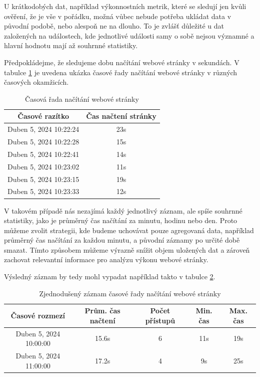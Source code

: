 U krátkodobých dat, například výkonnostních metrik, které se sledují jen kvůli ověření, že je vše v pořádku, možná vůbec nebude 
potřeba ukládat data v původní podobě, nebo alespoň ne na dlouho. To je zvlášť důležité u dat založených na událostech, kde jednotlivé 
události samy o sobě nejsou významné a hlavní hodnotu mají až souhrnné statistiky. \cite{nielsen2019practical}

Předpokládejme, že sledujeme dobu načítání webové stránky v sekundách.
V tabulce \ref{table:1} je uvedena ukázka časové řady načítání webové stránky v různých časových okamžicích.
\begin{table}[ht!]
\centering
\begin{tabular}{||c | c||} 
    \hline
    \textbf{Časové razítko} & \textbf{Čas načtení stránky} \\ [0.5ex] 
    \hline\hline
    Duben 5, 2024 10:22:24 & 23s \\ 
    \hline
    Duben 5, 2024 10:22:28 & 15s \\
    \hline
    Duben 5, 2024 10:22:41 & 14s \\
    \hline
    Duben 5, 2024 10:23:02 & 11s \\
    \hline
    Duben 5, 2024 10:23:15 & 19s \\
    \hline
    Duben 5, 2024 10:23:33 & 12s \\
    \hline
\end{tabular}
\caption{Časová řada načítání webové stránky}
\label{table:1}
\end{table}

V takovém případě nás nezajímá každý jednotlivý záznam, ale spíše souhrnné statistiky, jako je průměrný čas načítání za minutu, hodinu nebo den.
Proto můžeme zvolit strategii, kde budeme uchovávat pouze agregovaná data, například průměrný čas načítání za každou minutu, a původní záznamy po určité době smazat.
Tímto způsobem můžeme výrazně snížit objem uložených dat a zároveň zachovat relevantní informace pro analýzu výkonu webové stránky. \cite{nielsen2019practical}

Výsledný záznam by tedy mohl vypadat například takto v tabulce \ref{table:2}.
\begin{table}[ht!]
\centering
\begin{tabular}{||c | c | c | c | c||} 
    \hline
    \textbf{Časové rozmezí} & \textbf{Prům. čas načtení} & \textbf{Počet přístupů} & \textbf{Min. čas} & \textbf{Max. čas} \\ [0.5ex] 
    \hline\hline
    Duben 5, 2024 10:00:00 & 15.6s & 6 & 11s & 19s \\ 
    \hline
    Duben 5, 2024 11:00:00 & 17.2s & 4 & 9s & 25s \\
    \hline
\end{tabular}
\caption{Zjednodušený záznam časové řady načítání webové stránky}
\label{table:2}
\end{table}


